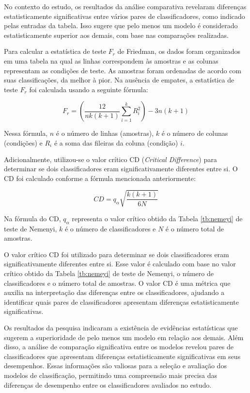 No contexto do estudo, os resultados da análise comparativa revelaram diferenças estatisticamente significativas entre vários pares de classificadores, como indicado pelas entradas da tabela. Isso sugere que pelo menos um modelo é considerado estatisticamente superior aos demais, com base nas comparações realizadas.

Para calcular a estatística de teste $F_r$ de Friedman, os dados foram organizados em uma tabela na qual as linhas correspondem às amostras e as colunas representam as condições de teste. As amostras foram ordenadas de acordo com suas classificações, da melhor à pior. Na ausência de empates, a estatística de teste $F_r$ foi calculada usando a seguinte fórmula:

\begin{equation}
	F_r = \left(\frac{12}{n k(k+1)} \sum_{i=1}^k R_i^2\right) - 3n(k+1)
\end{equation}

Nessa fórmula, $n$ é o número de linhas (amostras), $k$ é o número de colunas (condições) e $R_i$ é a soma das fileiras da coluna (condição) $i$.

Adicionalmente, utilizou-se o valor crítico CD (\textit{Critical Difference}) para determinar se dois classificadores eram significativamente diferentes entre si. O CD foi calculado conforme a fórmula mencionada anteriormente:

\begin{equation}
	CD = q_\alpha \sqrt{\frac{k(k+1)}{6N}}
\end{equation}

Na fórmula do CD, $q_\alpha$ representa o valor crítico obtido da Tabela \ref{tb:nemeyi} de teste de Nemenyi, $k$ é o número de classificadores e $N$ é o número total de amostras.

O valor crítico CD foi utilizado para determinar se dois classificadores eram significativamente diferentes entre si. Esse valor é calculado com base no valor crítico obtido da Tabela \ref{tb:nemeyi} de teste de Nemenyi, o número de classificadores e o número total de amostras. O valor CD é uma métrica que auxilia na interpretação das diferenças entre os classificadores, ajudando a identificar quais pares de classificadores apresentam diferenças estatisticamente significativas.

Os resultados da pesquisa indicaram a existência de evidências estatísticas que sugerem a superioridade de pelo menos um modelo em relação aos demais. Além disso, a análise de comparação significativa entre os modelos revelou pares de classificadores que apresentam diferenças estatisticamente significativas em seus desempenhos. Essas informações são valiosas para a seleção e avaliação dos modelos de classificação, permitindo uma compreensão mais precisa das diferenças de desempenho entre os classificadores avaliados no estudo.


